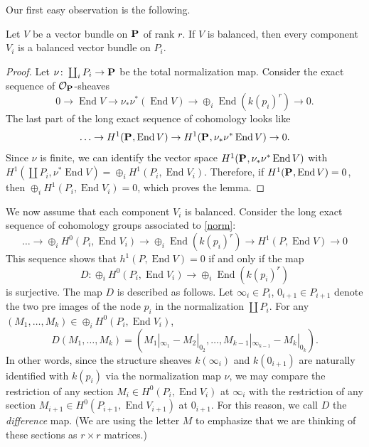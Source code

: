 \documentclass[11pt, two side, letterpaper, final]{amsart}
\renewcommand{\P}{{\bf P}}
\newcommand {\from}{\colon}
\DeclareMathOperator{\End}{End}
\newcommand{\chain}[1]{\P_{#1}}
\begin{document}
Our first easy observation is the following.
\begin{lemma}
\label{lemma-balanced-components}
Let $V$ be a vector bundle on $\chain{}$ of rank $r$. If $V$ is balanced, then every component $V_{i}$ is a balanced vector bundle on $P_{i}$.
\end{lemma} 
\begin{proof}
Let $\nu \from \coprod_{i} P_{i} \to \chain{}$ be the total normalization map. Consider the exact sequence of $\sh{O}_{\chain{}}$-sheaves 
\begin{equation}\label{norm}
0 \to \End V \to \nu_{*}\nu^{*}(\End V) \to \oplus_{i} \End (k(p_{i})^{r}) \to 0.
\end{equation}
 The last part of the long exact sequence of cohomology looks like \[\ldots \to H^{1}(\chain{}, \End V) \to H^{1}(\chain{}, \nu_{*}\nu^{*}\End V)  \to 0.\]  Since $\nu$ is finite, we can identify the vector space $H^{1}(\chain{}, \nu_{*}\nu^{*}\End V)$ with $H^{1}(\coprod P_{i}, \nu^{*}\End V) = \oplus_{i}H^{1}(P_{i}, \End V_{i})$.  Therefore, if $H^{1}(\chain{}, \End V) = 0$, then $\oplus_{i}H^{1}(P_{i}, \End V_{i}) = 0$, which proves the lemma.
\end{proof}

We now assume that each component $V_{i}$ is balanced.  Consider the long exact sequence of cohomology groups associated to \eqref{norm}: 
\begin{equation}\label{les}
\ldots \to \oplus_{i}H^{0}(P_{i}, \End V_{i}) \to \oplus_{i} \End (k(p_{i})^{r}) \to H^{1}(P, \End V) \to 0
\end{equation}
This sequence shows that $h^{1}(P, \End V) = 0$ if and only if the map \[D \from \oplus_{i}H^{0}(P_{i}, \End V_{i}) \to \oplus_{i} \End (k(p_{i})^{r})\] is surjective.  The map $D$ is described as follows.  Let $\infty_i \in P_{i}$, $0_{i+1} \in P_{i+1}$ denote the two pre images of the node $p_{i}$ in the normalization $\coprod P_{i}$. For any $(M_{1}, \ldots ,M_{k}) \in \oplus_{i}H^{0}(P_{i}, \End V_{i})$,
\[
D(M_{1}, \ldots ,M_{k}) = (M_{1}|_{\infty_{1}} - M_{2}|_{0_{2}}, \ldots , M_{k-1}|_{\infty_{k-1}} - M_{k}|_{0_{k}}).
\]
In other words, since the structure sheaves $k(\infty_i)$ and $k(0_{i+1})$ are naturally identified with $k(p_{i})$ via the normalization map $\nu$, we may compare the restriction of any section $M_{i} \in H^{0}(P_{i}, \End V_{i})$ at $\infty_i$ with the restriction of any section $M_{i+1} \in H^{0}(P_{i+1}, \End V_{i+1})$ at $0_{i+1}$.  For this reason, we call $D$ the \emph{difference} map.  (We are using the letter $M$ to emphasize that we are thinking of these sections as $r \times r$ matrices.)
\end{document}
